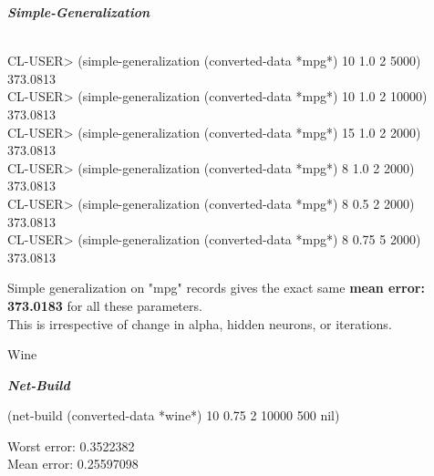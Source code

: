 \documentclass{article}
\begin{document}
 \textbf{\emph{Simple-Generalization}\\}\\
\begin{normalsize}
CL-USER> (simple-generalization (converted-data *mpg*) 10 1.0 2 5000)\\
373.0813\\
CL-USER> (simple-generalization (converted-data *mpg*) 10 1.0 2 10000)\\
373.0813\\
CL-USER> (simple-generalization (converted-data *mpg*) 15 1.0 2 2000)\\
373.0813\\
CL-USER> (simple-generalization (converted-data *mpg*) 8 1.0 2 2000)\\
373.0813\\
CL-USER> (simple-generalization (converted-data *mpg*) 8 0.5 2 2000)\\
373.0813\\
CL-USER> (simple-generalization (converted-data *mpg*) 8 0.75 5 2000)\\
373.0813\\
\end{normalsize}

 \begin{normalsize}
 Simple generalization on "mpg" records gives the exact same \textbf{mean error: 373.0183} for all these parameters.\\
 This is irrespective of change in alpha, hidden neurons, or iterations.\\
 \end{normalsize}
 
 
\begin{flushleft}
 \begin{Large}
 Wine\\
 \end{Large}
\end{flushleft}
 
\textbf{\emph{Net-Build}}\\

\begin{small}
(net-build (converted-data *wine*) 10 0.75 2 10000 500 nil)
\end{small}

\begin{flushleft}
\begin{normalsize}
Worst error: 0.3522382\\
Mean error: 0.25597098\\
\end{normalsize}
\end{flushleft}
 
\end{document}
